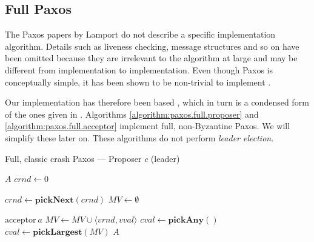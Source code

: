 \subsection{Full Paxos}

The Paxos papers by Lamport \cite{Lamport:1998:PP:279227.279229,Lam01}
do not describe a specific implementation algorithm.
Details such as liveness checking, message structures and so on have
been omitted because they are irrelevant to the algorithm at large and may be
different from implementation to implementation.  Even though Paxos
is conceptually simple, it has been shown to be non-trivial to implement
\cite{Chandra:2007:PML:1281100.1281103}.

Our implementation has therefore been based 
\cite{Insane.Paxos}, which in turn is a condensed form of the ones given in 
\cite{renesse.paxos,Lam01}.
%
Algorithms \ref{algorithm:paxos.full.proposer} and
\ref{algorithm:paxos.full.acceptor} implement full, non-Byzantine Paxos.
We will simplify these later on.  These algorithms do not perform \textit{leader
election}.

\begin{algorithm}
  \caption{Full, classic crash Paxos --- Proposer $c$ (leader)}
  \label{algorithm:paxos.full.proposer}
  \begin{algorithmic}

    \State $A$ 
    \State $crnd \gets 0$ 
    \State

      \State $crnd \gets \textbf{pickNext}(crnd)$ 
      \State $MV \gets \emptyset$ 
      \State {}
    \EndOn
    \State

       {$\text{acceptor}\ a$} 
        \State $MV \gets MV \cup \langle vrnd, vval \rangle$
            \State $cval \gets \textbf{pickAny}()$ 
          \Else
            \State $cval \gets \textbf{pickLargest}(MV)$ 
          \EndIf
         \State {}
                       {$A$}
        \EndIf
      \EndIf
    \EndOn
  \end{algorithmic}
\end{algorithm}

